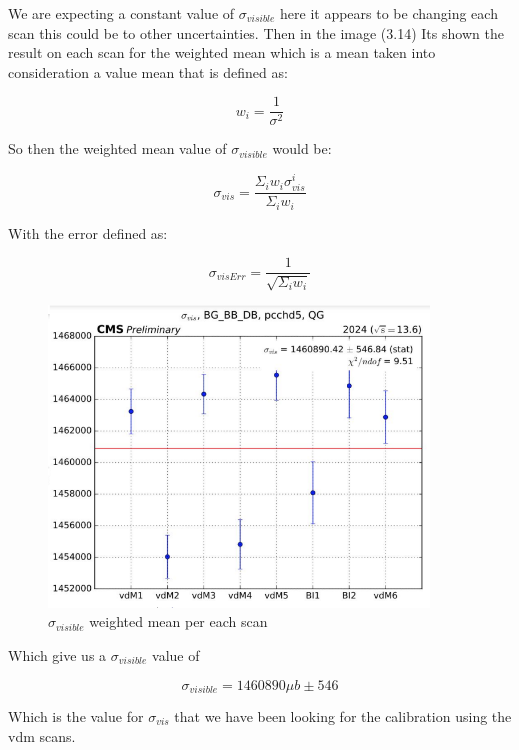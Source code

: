 We are expecting a constant value of $\sigma_{visible}$ here it appears to be changing each scan this could be to other uncertainties. Then in the image (3.14) Its shown the result on each scan for the weighted mean which is a mean taken into consideration a value mean that is defined as:

\begin{equation}
w_{i}=\frac{1}{\sigma^{2}}
\end{equation}

So then the weighted mean value of $\sigma_{visible}$ would be:

\begin{equation}
\sigma_{vis} = \frac {\Sigma_{i} w_{i} \sigma^{i}_{vis}}{\Sigma_{i} w_{i}} 
\end{equation}

With the error defined as:

\begin{equation}
\sigma_{visErr} = \frac{1}{\sqrt{\Sigma_{i} w_{i}}}
\end{equation}

\begin{figure}[H]
    \centering
    \includegraphics[width=0.9\textwidth]{sigscan.png}
    \caption{$\sigma_{visible}$ weighted mean per each scan}
    \label{fig:sigscan}
\end{figure}

Which give us a $\sigma_{visible}$ value of 

\begin{equation}
\sigma_{visible} = 1460890 \mu b \pm 546
\end{equation}

Which is the value for $\sigma_{vis}$ that we have been looking for the calibration using the vdm scans.

